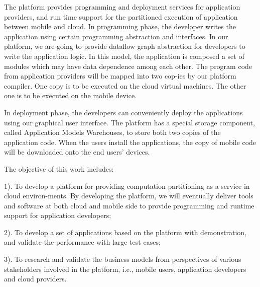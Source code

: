 The platform provides programming and deployment services for application providers, and run time support for the partitioned execution of application between mobile and cloud. In programming phase, the developer writes the application using certain programming abstraction and interfaces. In our platform, we are going to provide dataflow graph abstraction for developers to write the application logic. In this model, the application is composed a set of modules which may have data dependence among each other. The program code from application providers will be mapped into two cop-ies by our platform compiler. One copy is to be executed on the cloud virtual machines. The other one is to be executed on the mobile device.

In deployment phase, the developers can conveniently deploy the applications using our graphical user interface. The platform has a special storage component, called Application Models Warehouses, to store both two copies of the application code. When the users install the applications, the copy of mobile code will be downloaded onto the end users' devices.

The objective of this work includes:

1). To develop a platform for providing computation partitioning as a service in cloud environ-ments. By developing the platform, we will eventually deliver tools and software at both cloud and mobile side to provide programming and runtime support for application developers;

2). To develop a set of applications based on the platform with demonstration, and validate the performance with large test cases;

3). To research and validate the business models from perspectives of various stakeholders involved in the platform, i.e., mobile users, application developers and cloud providers.
